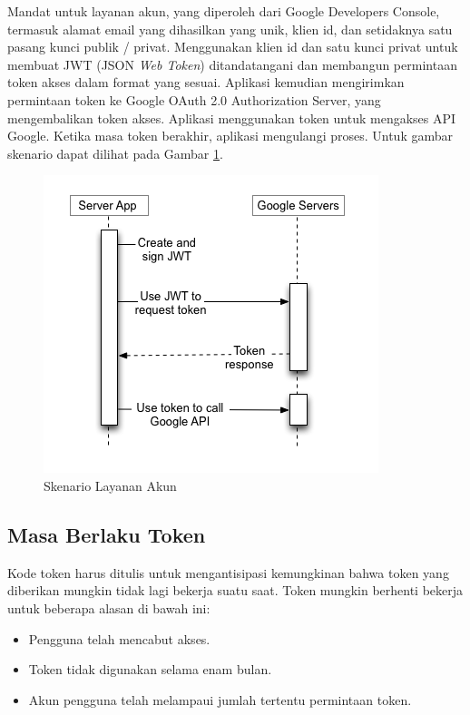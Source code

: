 \begin{itemize}
Mandat untuk layanan akun, yang diperoleh dari Google Developers Console, termasuk alamat email yang dihasilkan yang unik, klien id, dan setidaknya satu pasang kunci publik / privat. Menggunakan klien id dan satu kunci privat untuk membuat JWT (JSON {\it Web Token}) ditandatangani dan membangun permintaan token akses dalam format yang sesuai. Aplikasi kemudian mengirimkan permintaan token ke Google OAuth 2.0 Authorization Server, yang mengembalikan token akses. Aplikasi menggunakan token untuk mengakses API Google. Ketika masa token berakhir, aplikasi mengulangi proses. Untuk gambar skenario dapat dilihat pada Gambar \ref{fig:skenariolayananakun}.

\begin{figure}[h]
\centering
\includegraphics[scale=1]{Gambar/skenario4.png}
\caption[Skenario Layanan Akun]{Skenario Layanan Akun}
\label{fig:skenariolayananakun}
\end{figure}
\end{itemize}

\subsection{Masa Berlaku Token}
Kode token harus ditulis untuk mengantisipasi kemungkinan bahwa token yang diberikan mungkin tidak lagi bekerja suatu saat. Token mungkin berhenti bekerja untuk beberapa alasan di bawah ini:

\begin{itemize}
\item
Pengguna telah mencabut akses.
\item
Token tidak digunakan selama enam bulan.
\item
Akun pengguna telah melampaui jumlah tertentu permintaan token.
\end{itemize}

